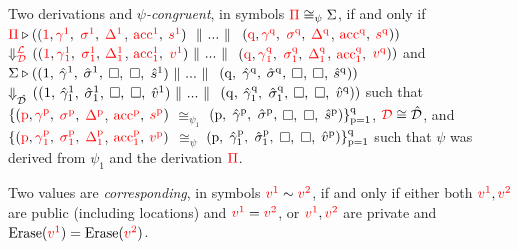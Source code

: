 \begin{definition}[$\RT\Pi\Pcong\Sigma$]%
\label{Def: deriv cong}
Two derivations and \emph{$\psi$-congruent}, in symbols $\RT\Pi\cong_{\psi}\Sigma$, 
if and only if 
\\ $\RT\Pi \deriv ((\RT\pidA, \rrgamma^{\RT{\pidA}}_{},$ $\rrsigma^{\RT{\pidA}}_{},$ $\RT\DMap^{\RT{\pidA}}_{}$, $\rAcc^{\RT{\pidA}}_{},$ $\rstmt^{\RT{\pidA}})\ \Mid ...\Mid$ 
	$(\RT\pidZ, \rrgamma^{\RT{\pidZ}}_{},$ $\rrsigma^{\RT{\pidZ}}_{},$ $\RT\DMap^{\RT{\pidZ}}_{}$, $\rAcc^{\RT{\pidZ}}_{},$ $\rstmt^{\RT{\pidZ}}))$ 
	 \\$\Deval{\RT\locLL}{\RT\codeLL}$ 
	$((\RT\pidA, {\rrgamma^{\RT{\pidA}}_{\RT1}},$ ${\rrsigma^{\RT{\pidA}}_{\RT1}},$ $\RT\DMap^{\RT{\pidA}}_{\RT1}$, $\rAcc^{\RT{\pidA}}_{\RT1},$ ${\RT\val^{\RT{\pidA}}_{}}) \Mid ... \Mid$ 
	$(\RT\pidZ, {\rrgamma^{\RT{\pidZ}}_{\RT1}},$ ${\rrsigma^{\RT{\pidZ}}_{\RT1}},$ $\RT\DMap^{\RT{\pidZ}}_{\RT1}$, $\rAcc^{\RT{\pidZ}}_{\RT1},$ $\RT\val^{\RT{\pidZ}}))$
and 
\\$\Sigma \deriv ((\pidA,$ $\hgamma^\pidA,$ $\hsigma^\pidA,$ $\bsq,$ $\bsq,$ $\hstmt^\pidA)\Mid ...\Mid $
	$(\pidZ,$ $\hgamma^\pidZ,$ $\hsigma^\pidZ,$ $\bsq,$ $\bsq,$ $\hstmt^\pidZ))$ 
\\	$\Deval{}{\codeVLL}$ 
	$((\pidA,$ $\hgamma^\pidA_1,$ $\hsigma^\pidA_1,$ $\bsq,$ $\bsq,$ $\hval^\pidA)\Mid...\Mid$
	$(\pidZ,$ $\hgamma^\pidZ_1,$ $\hsigma^\pidZ_1,$ $\bsq,$ $\bsq,$ $\hval^\pidZ))$
such that 
\\$\{(\RT\pid, \rrgamma^{\RT{\pid}}_{},$ $\rrsigma^{\RT{\pid}}_{},$ $\RT\DMap^{\RT{\pid}}_{}$, $\rAcc^{\RT{\pid}}_{},$ $\rstmt^{\RT{\pid}})$ $\cong_{\psi_1}$ 
$(\pid,$ $\hgamma^\pid,$ $\hsigma^\pid,$ $\bsq,$ $\bsq,$ $\hstmt^\pid)\}^{\pidZ}_{\pid = \pidA}$, 
$\RT\codeLL \cong \codeVLL$, and 
\\$\{(\RT\pid, {\rrgamma^{\RT{\pid}}_{\RT1}},$ ${\rrsigma^{\RT{\pid}}_{\RT1}},$ $\RT\DMap^{\RT{\pid}}_{\RT1}$, $\rAcc^{\RT{\pid}}_{\RT1},$ $\RT\val^{\RT{\pid}}_{})$ $\cong_{\psi}$ 
$(\pid,$ $\hgamma^\pid_1,$ $\hsigma^\pid_1,$ $\bsq,$ $\bsq,$ $\hval^\pid)\}^{\pidZ}_{\pid = \pidA}$ such that $\psi$ was derived from $\psi_1$ and the derivation $\RT\Pi$. 
\end{definition}



\begin{definition}%
\label{def: val sim}
Two values are \emph{corresponding}, in symbols $\RT{\val^1}\sim\RT{\val^2}$, 
if and only if either both $\RT{\val^1},\RT{\val^2}$ are public (including locations) and $\RT{\val^1}=\RT{\val^2}$, 
or $\RT{\val^1},\RT{\val^2}$ are private and $\erasure(\RT{\val^1}) = \erasure(\RT{\val^2})$.
\end{definition}



